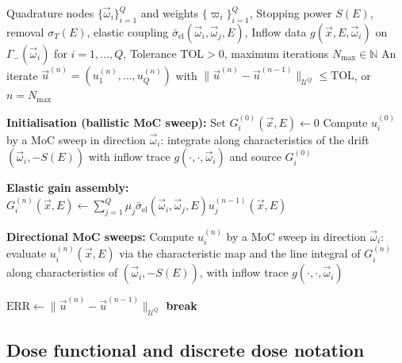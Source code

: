 \documentclass[final]{amsart}
\begin{document}
\begin{algorithm}[t]
\caption{Source iteration with method-of-characteristics (MoC) directional sweeps}
\label{alg:iterative_algorithm}
\begin{algorithmic}[1]
\Require Quadrature nodes $\{\vec{\omega}_i\}_{i=1}^Q$ and weights $\{\varpi_i\}_{i=1}^Q$, Stopping power $S(E)$, removal $\sigma_T(E)$, elastic coupling $\bar\sigma_{\mathrm{el}}(\vec{\omega}_i,\vec{\omega}_j,E)$, Inflow data $g(\vec{x},E,\vec{\omega}_i)$ on $\Gamma_-(\vec{\omega}_i)$ for $i=1,\dots,Q$, Tolerance $\mathrm{TOL}>0$, maximum iterations $N_{\max}\in\mathbb N$
\Ensure An iterate $\vec{u}^{(n)}=(u_1^{(n)},\dots,u_Q^{(n)})$ with
$\|\vec{u}^{(n)}-\vec{u}^{(n-1)}\|_{\mathcal{U}^Q}\le \mathrm{TOL}$, or $n=N_{\max}$

\Statex

\State \textbf{Initialisation (ballistic MoC sweep):}
  \State Set $G_i^{(0)}(\vec{x},E)\gets 0$
  \State Compute $u_i^{(0)}$ by a MoC sweep in direction $\vec{\omega}_i$:
  integrate along characteristics of the drift $(\vec{\omega}_i,-S(E))$
  with inflow trace $g(\cdot,\cdot,\vec{\omega}_i)$ and source $G_i^{(0)}$
\EndFor

\Statex

  \State \textbf{Elastic gain assembly:}
    \State $G_i^{(n)}(\vec{x},E)\gets \sum_{j=1}^Q \mu_j \bar\sigma_{\mathrm{el}}(\vec{\omega}_i,\vec{\omega}_j,E) u_j^{(n-1)}(\vec{x},E)$
  \EndFor

  \State \textbf{Directional MoC sweeps:}
    \State Compute $u_i^{(n)}$ by a MoC sweep in direction $\vec{\omega}_i$:
    evaluate $u_i^{(n)}(\vec{x},E)$ via the characteristic map and the
    line integral of $G_i^{(n)}$ along characteristics of $(\vec{\omega}_i,-S(E))$,
    with inflow trace $g(\cdot,\cdot,\vec{\omega}_i)$
  \EndFor

  \State $\mathrm{ERR}\gets \|\vec{u}^{(n)}-\vec{u}^{(n-1)}\|_{\mathcal{U}^Q}$
    \State \textbf{break}
  \EndIf
\EndFor
\end{algorithmic}
\end{algorithm}

\subsection{Dose functional and discrete dose notation}
\label{subsec:dose_def}
\end{document}
